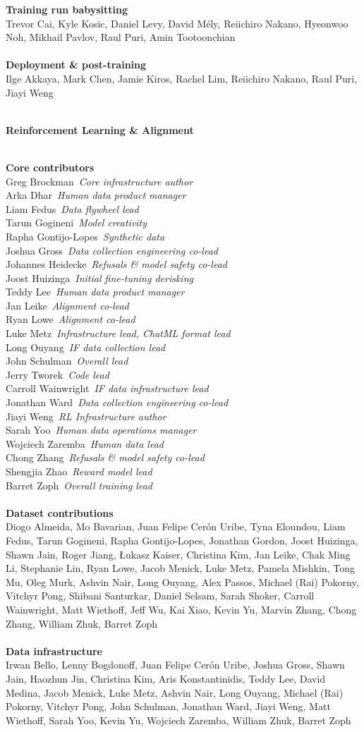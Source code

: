 \documentclass{article}
\newcommand{\creditsectionheader}[1]{\parbox{\columnwidth}{\centering \textbf{\small #1}}\\}
\newcommand{\creditlistheader}[1]{\textbf{#1}\footnotemark[\thefootnote]\\}
\newcommand{\creditlist}[2]{\creditlistheader{#1}#2\\
\\}
\newcommand{\corecontributor}[2]{#1\ \textit{#2}\\}
\begin{document}
\begin{multicols}{2}
\creditlist{Training run babysitting}{Trevor Cai, Kyle Kosic, Daniel Levy, David M\'ely, Reiichiro Nakano, Hyeonwoo Noh, Mikhail Pavlov, Raul Puri, Amin Tootoonchian}
\creditlist{Deployment \& post-training}{Ilge Akkaya, Mark Chen, Jamie Kiros, Rachel Lim, Reiichiro Nakano, Raul Puri, Jiayi Weng}
\creditsectionheader{Reinforcement Learning \& Alignment}
\creditlistheader{Core contributors}
\corecontributor{Greg Brockman}{Core infrastructure author}
\corecontributor{Arka Dhar}{Human data product manager}
\corecontributor{Liam Fedus}{Data flywheel lead}
\corecontributor{Tarun Gogineni}{Model creativity}
\corecontributor{Rapha Gontijo-Lopes}{Synthetic data}
\corecontributor{Joshua Gross}{Data collection engineering co-lead}
\corecontributor{Johannes Heidecke}{Refusals \& model safety co-lead}
\corecontributor{Joost Huizinga}{Initial fine-tuning derisking}
\corecontributor{Teddy Lee}{Human data product manager}
\corecontributor{Jan Leike}{Alignment co-lead}
\corecontributor{Ryan Lowe}{Alignment co-lead}
\corecontributor{Luke Metz}{Infrastructure lead, ChatML format lead}
\corecontributor{Long Ouyang}{IF data collection lead}
\corecontributor{John Schulman}{Overall lead}
\corecontributor{Jerry Tworek}{Code lead}
\corecontributor{Carroll Wainwright}{IF data infrastructure lead}
\corecontributor{Jonathan Ward}{Data collection engineering co-lead}
\corecontributor{Jiayi Weng}{RL Infrastructure author}
\corecontributor{Sarah Yoo}{Human data operations manager}
\corecontributor{Wojciech Zaremba}{Human data lead}
\corecontributor{Chong Zhang}{Refusals \& model safety co-lead}
\corecontributor{Shengjia Zhao}{Reward model lead}
\corecontributor{Barret Zoph}{Overall training lead}
\\
\creditlist{Dataset contributions}{Diogo Almeida, Mo Bavarian, Juan Felipe Cer\'on Uribe, Tyna Eloundou, Liam Fedus, Tarun Gogineni, Rapha Gontijo-Lopes, Jonathan Gordon, Joost Huizinga, Shawn Jain, Roger Jiang, \L{}ukasz Kaiser, Christina Kim, Jan Leike, Chak Ming Li, Stephanie Lin, Ryan Lowe, Jacob Menick, Luke Metz, Pamela Mishkin, Tong Mu, Oleg Murk, Ashvin Nair, Long Ouyang, Alex Passos, Michael (Rai) Pokorny, Vitchyr Pong, Shibani Santurkar, Daniel Selsam, Sarah Shoker, Carroll Wainwright, Matt Wiethoff, Jeff Wu, Kai Xiao, Kevin Yu, Marvin Zhang, Chong Zhang, William Zhuk, Barret Zoph}
\creditlist{Data infrastructure}{Irwan Bello, Lenny Bogdonoff, Juan Felipe Cer\'on Uribe, Joshua Gross, Shawn Jain, Haozhun Jin, Christina Kim, Aris Konstantinidis, Teddy Lee, David Medina, Jacob Menick, Luke Metz, Ashvin Nair, Long Ouyang, Michael (Rai) Pokorny, Vitchyr Pong, John Schulman, Jonathan Ward, Jiayi Weng, Matt Wiethoff, Sarah Yoo, Kevin Yu, Wojciech Zaremba, William Zhuk, Barret Zoph}

\end{multicols}
\end{document}
